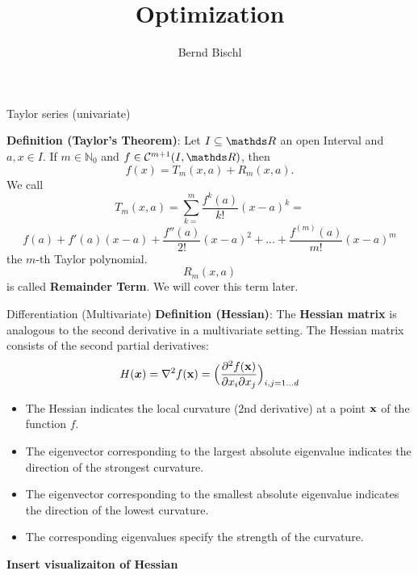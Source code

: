 





\newcommand{\titlefigure}{figure_man/hinge_vs_l2.pdf}
\newcommand{\learninggoals}{
\item Taylor series (Univariate)
\item Hessian Matrix
\item Taylor series (Multivariate)}



\title{Optimization}
\author{Bernd Bischl}
\date{}



\sloppy
   
\begin{vbframe}{Taylor series (univariate)}

    \textbf{Definition (Taylor's Theorem)}: Let $I \subseteq \R$ an open Interval and $a, x \in I$. If $m \in \mathbb{N}_0$ and $f \in \mathcal{C}^{m+1}(I,\R)$, then
    $$f(x) = T_{m}(x,a) + R_{m}(x,a).$$
    We call
    $$T_{m}(x,a) = \sum_{k=}^{m} \frac{f^{k}(a)}{k!}(x-a)^{k} = $$
    $$f(a) + f'(a)(x-a) + \frac{f''(a)}{2!}(x-a)^{2} + ... + \frac{f^{(m)}(a)}{m!}(x-a)^{m}$$ the $m$-th Taylor polynomial.
    $$R_{m}(x,a)$$ is called \textbf{Remainder Term}. We will cover this term later.    
\end{vbframe}

\begin{vbframe}{Differentiation (Multivariate)}
  \textbf{Definition (Hessian)}: The \textbf{Hessian matrix} is analogous to the second derivative in a multivariate setting. The Hessian matrix consists of the second partial derivatives:
  \[ H(\boldsymbol{x}) =\nabla^2 f(\mathbf{x}) =
  \Bigl(\frac{\partial^2 f(\mathbf{x})}{\partial x_i \partial x_j}\Bigr)_{i,j=1\ldots d}\]
  \begin{itemize}
  \item The Hessian indicates the local curvature (2nd derivative) at a point $\mathbf{x}$ of the function $f$.
  \item The eigenvector corresponding to the largest absolute eigenvalue indicates the direction of the strongest curvature.
  \item The eigenvector corresponding to the smallest absolute eigenvalue indicates the direction of the lowest curvature.
  \item The corresponding eigenvalues specify the strength of the curvature.
  \end{itemize}


  \framebreak 

    \textbf{Insert visualizaiton of Hessian}
  \end{vbframe}
  \framebreak 

